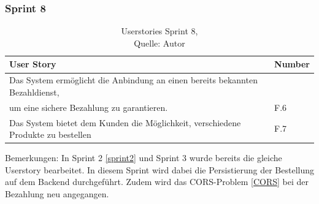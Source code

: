 \subsubsection{Sprint 8}\label{sprint8}
\begin{table}[H]
	\begin{tabularx}{\textwidth}{|l|X|}
		\hline
		\textbf{User Story} & \textbf{Number} \\
		\hline
		Das System ermöglicht die Anbindung an einen bereits bekannten Bezahldienst,\\ um eine sichere Bezahlung zu garantieren.  & F.6\\
		\hline
		Das System bietet dem Kunden die Möglichkeit, verschiedene Produkte zu bestellen& F.7\\
		\hline
	\end{tabularx} 
	\caption[Userstories Sprint 8]{Userstories Sprint 8,\\ Quelle: Autor}
\end{table}\label{userStoriesSprint8}
Bemerkungen: In Sprint 2  \ref{sprint2} und Sprint 3 wurde bereits die gleiche Userstory bearbeitet. In diesem Sprint wird dabei die Persistierung der Bestellung auf dem Backend durchgeführt. Zudem wird das CORS-Problem \ref{CORS} bei der Bezahlung neu angegangen. 


